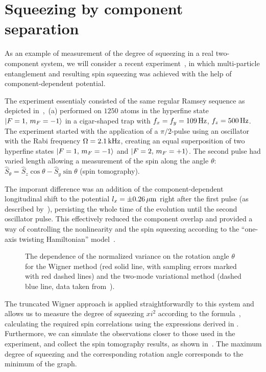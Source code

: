 \section{Squeezing by component separation}

As an example of measurement of the degree of squeezing in a real two-component  system, we will consider a recent experiment~\cite{Riedel2010}, in which multi-particle entanglement and resulting spin squeezing was achieved with the help of component-dependent potential.

The experiment essentialy consisted of the same regular Ramsey sequence as depicted in~,~(a) performed on $1250$ \Rb{} atoms in the hyperfine state ${\mbox{\ensuremath{\vert F=1,\, m_F=-1 \rangle}}}$ in a cigar-shaped trap with $f_x = f_y = 109\mbox{\ensuremath{\,\mathrm{Hz}}}$, $f_z = 500\mbox{\ensuremath{\,\mathrm{Hz}}}$.
The experiment started with the application of a $\pi/2$-pulse using an oscillator with the Rabi frequency $\Omega=2.1\mbox{\ensuremath{\,\mathrm{kHz}}}$, creating an equal superposition of two hyperfine states ${\mbox{\ensuremath{\vert F=1,\, m_F=-1 \rangle}}}$ and ${\mbox{\ensuremath{\vert F=2,\, m_F=+1 \rangle}}}$.
The second pulse had varied length allowing a measurement of the spin along the angle $\theta$: $\hat{S}_\theta = \hat{S}_z \cos \theta - \hat{S}_y \sin \theta$ (spin tomography).

The imporant difference was an addition of the component-dependent longitudinal shift to the potential $l_x = \pm 0.26\mbox{\ensuremath{\,\mathrm{\mu m}}}$ right after the first pulse (as described by~), persisting the whole time of the evolution until the second oscillator pulse.
This effectively reduced the component overlap and provided a way of controlling the nonlinearity and the spin squeezing according to the ``one-axis twisting Hamiltonian'' model~\cite{Kitagawa1993}.

\begin{figure}

    \caption{
    The dependence of the normalized variance on the rotation angle $\theta$ for
    the Wigner method (red solid line, with sampling errors marked with red dashed lines) and the two-mode variational method (dashed blue line, data taken from~\cite{Riedel2010}).
    }
    \label{fig:bec-squeezing:separation:tomography}
\end{figure}

The truncated Wigner approach is applied straightforwardly to this system and allows us to measure the degree of squeezing $xi^2$ according to the formula~, calculating the required spin correlations using the expressions derived in .
Furthermore, we can simulate the observations closer to those used in the experiment, and collect the spin tomography results, as shown in~.
The maximum degree of squeezing and the corresponding rotation angle corresponds to the minimum of the graph.

